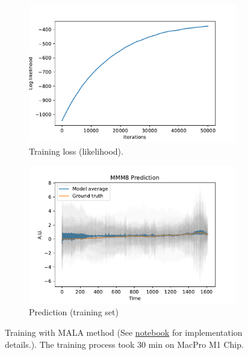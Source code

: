 \documentclass{article}
\begin{document}
\begin{figure}[h]
    \centering
    \begin{subfigure}[b]{0.5\textwidth}
        \centering
        \includegraphics[width=\textwidth]{../img/training_MALA_50000-iter.pdf}
        \caption{Training loss (likelihood).}
        \label{fig:training-log}
    \end{subfigure}%
    \begin{subfigure}[b]{0.5\textwidth}
        \centering
        \includegraphics[width=\textwidth]{../img/prediction_MALA_50000-iter.pdf}
        \caption{Prediction (training set)}
    \end{subfigure}
    \caption{Training with MALA method (See \href{https://github.com/stevengogogo/ECEN649_FinalProject/blob/main/script/EXP_fit_time_window.ipynb}{notebook} for implementation details.). The training process took $30$ min on MacPro M1 Chip.}
    \label{fig:pred}
\end{figure}



\end{document}
